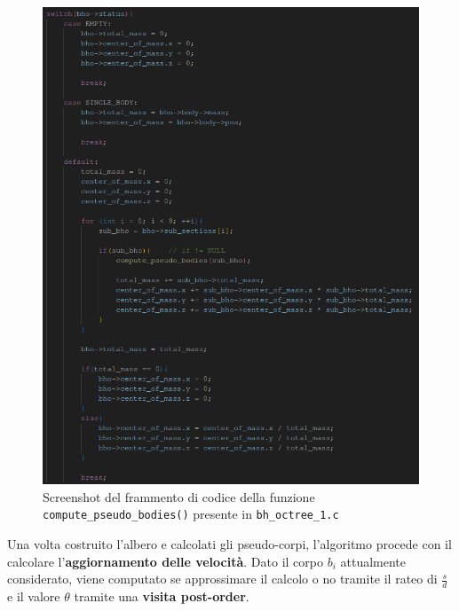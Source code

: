 \documentclass[12pt]{report}
\begin{document}
    \begin{figure}[H]
        \centering
        \includegraphics[width=\textwidth]{images/pseudo_bodies.png}
        \caption{Screenshot del frammento di codice della funzione \texttt{compute\_pseudo\_bodies()} presente in \texttt{bh\_octree\_1.c}}
        \label{fig:pseudo_bodies}
    \end{figure}

    Una volta costruito l'albero e calcolati gli pseudo-corpi, l'algoritmo procede con il calcolare l'\textbf{aggiornamento delle velocità}. Dato il corpo $b_i$ attualmente considerato, viene computato se approssimare il calcolo o no tramite il rateo di $\frac{s}{d}$ e il valore $\theta$ tramite una \textbf{visita post-order}.
    
\end{document}

